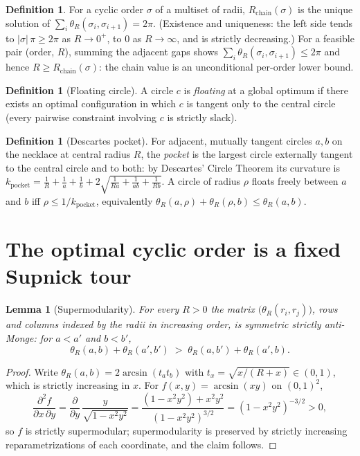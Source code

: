 \documentclass[11pt]{article}
\newtheorem{lemma}[theorem]{Lemma}
\theoremstyle{definition}
\newtheorem{definition}[theorem]{Definition}
\theoremstyle{remark}
\DeclareMathOperator{\asin}{arcsin}
\begin{document}
\begin{definition}
For a cyclic order $\sigma$ of a multiset of radii, $R_{\mathrm{chain}}(\sigma)$ is the unique solution of $\sum_i \theta_R(\sigma_i,\sigma_{i+1})=2\pi$. (Existence and uniqueness: the left side tends to $|\sigma|\,\pi\ge 2\pi$ as $R\to0^+$, to $0$ as $R\to\infty$, and is strictly decreasing.) For a feasible pair (order, $R$), summing the adjacent gaps shows $\sum_i\theta_R(\sigma_i,\sigma_{i+1})\le2\pi$ and hence $R\ge R_{\mathrm{chain}}(\sigma)$: the chain value is an unconditional per-order lower bound.
\end{definition}

\begin{definition}[Floating circle]
A circle $c$ is \emph{floating} at a global optimum if there exists an optimal configuration in which $c$ is tangent only to the central circle (every pairwise constraint involving $c$ is strictly slack).
\end{definition}

\begin{definition}[Descartes pocket]
For adjacent, mutually tangent circles $a,b$ on the necklace at central radius $R$, the \emph{pocket} is the largest circle externally tangent to the central circle and to both: by Descartes' Circle Theorem its curvature is
$k_{\mathrm{pocket}}=\frac1R+\frac1a+\frac1b+2\sqrt{\frac1{Ra}+\frac1{ab}+\frac1{Rb}}$.
A circle of radius $\rho$ floats freely between $a$ and $b$ iff $\rho\le 1/k_{\mathrm{pocket}}$, equivalently $\theta_R(a,\rho)+\theta_R(\rho,b)\le\theta_R(a,b)$.
\end{definition}

\section{The optimal cyclic order is a fixed Supnick tour}\label{sec:theoremA}

\begin{lemma}[Supermodularity]\label{lem:supermodular}
For every $R>0$ the matrix $\big(\theta_R(r_i,r_j)\big)$, rows and columns indexed by the radii in increasing order, is symmetric strictly anti-Monge: for $a<a'$ and $b<b'$,
\[
\theta_R(a,b)+\theta_R(a',b') \;>\; \theta_R(a,b')+\theta_R(a',b).
\]
\end{lemma}

\begin{proof}
Write $\theta_R(a,b)=2\asin(t_a t_b)$ with $t_x=\sqrt{x/(R+x)}\in(0,1)$, which is strictly increasing in $x$. For $f(x,y)=\asin(xy)$ on $(0,1)^2$,
\[
\frac{\partial^2 f}{\partial x\,\partial y}
=\frac{\partial}{\partial y}\,\frac{y}{\sqrt{1-x^2y^2}}
=\frac{(1-x^2y^2)+x^2y^2}{(1-x^2y^2)^{3/2}}
=(1-x^2y^2)^{-3/2}>0,
\]
so $f$ is strictly supermodular; supermodularity is preserved by strictly increasing reparametrizations of each coordinate, and the claim follows.
\end{proof}
\end{document}
